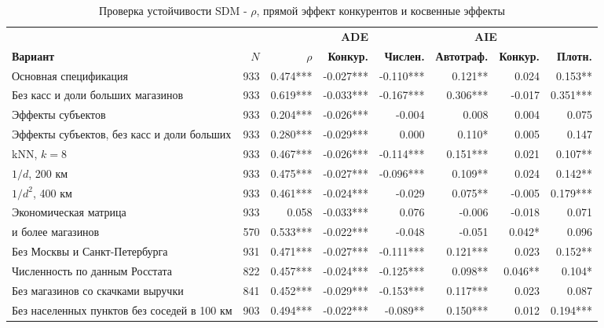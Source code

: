 \documentclass[12pt, a4paper]{article}
\begin{document}
\begin{table}[H]
    \centering
    \footnotesize
    \setlength{\tabcolsep}{4pt}
    \caption{Проверка устойчивости SDM - $\rho$, прямой эффект конкурентов и косвенные эффекты}
    \label{tab:robustness}
    \begin{tabular}{>{\raggedright\arraybackslash}p{4.6cm}rrrrrrr}
        \toprule
        & & & \textbf{ADE} & \multicolumn{4}{c}{\textbf{AIE}} \\
        \cmidrule(lr){4-4} \cmidrule(lr){5-8}
        \textbf{Вариант} & \textbf{$N$} & \textbf{$\rho$} & \textbf{Конкур.} & \textbf{Числен.} & \textbf{Автотраф.} & \textbf{Конкур.} & \textbf{Плотн.} \\
        \midrule
        Основная спецификация & 933 & 0.474*** & -0.027*** & -0.110*** & 0.121** & 0.024 & 0.153** \\
        Без касс и доли больших магазинов & 933 & 0.619*** & -0.033*** & -0.167*** & 0.306*** & -0.017 & 0.351*** \\
        Эффекты субъектов & 933 & 0.204*** & -0.026*** & -0.004 & 0.008 & 0.004 & 0.075 \\
        Эффекты субъектов, без касс и доли больших & 933 & 0.280*** & -0.029*** & 0.000 & 0.110* & 0.005 & 0.147 \\
        \midrule
        kNN, $k = 8$ & 933 & 0.467*** & -0.026*** & -0.114*** & 0.151*** & 0.021 & 0.107** \\
        $1/d$, 200 км & 933 & 0.475*** & -0.027*** & -0.096*** & 0.109** & 0.024 & 0.142** \\
        $1/d^2$, 400 км & 933 & 0.461*** & -0.024*** & -0.029 & 0.075** & -0.005 & 0.179*** \\
        Экономическая матрица & 933 & 0.058 & -0.033*** & 0.076 & -0.006 & -0.018 & 0.071 \\
        \midrule
        5 и более магазинов & 570 & 0.533*** & -0.022*** & -0.048 & -0.051 & 0.042* & 0.096 \\
        Без Москвы и Санкт-Петербурга & 931 & 0.471*** & -0.027*** & -0.111*** & 0.121*** & 0.023 & 0.152** \\
        Численность по данным Росстата & 822 & 0.457*** & -0.024*** & -0.125*** & 0.098** & 0.046** & 0.104* \\
        Без магазинов со скачками выручки & 841 & 0.452*** & -0.029*** & -0.153*** & 0.117*** & 0.023 & 0.087 \\
        Без населенных пунктов без соседей в 100 км & 903 & 0.494*** & -0.022*** & -0.089** & 0.150*** & 0.012 & 0.194*** \\

\end{tabular}
\end{table}
\end{document}
